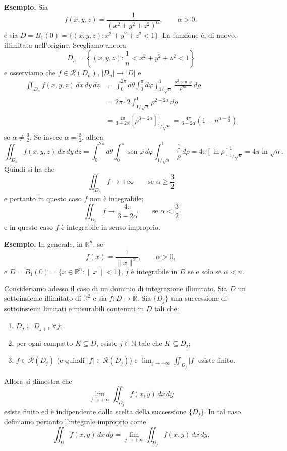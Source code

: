 \documentclass[11pt,a4paper]{article}
\newcommand{\R}{\mathbb{R}}
\newcommand{\N}{\mathbb{N}}
\newcommand{\sen}{\operatorname{sen}}
\begin{document}
\noindent\textbf{Esempio.} Sia
\[
f(x,y,z)=\frac{1}{(x^2+y^2+z^2)^\alpha},\qquad \alpha>0,
\]
e sia $D=B_1(0)=\{(x,y,z):x^2+y^2+z^2<1\}$. La funzione è, di nuovo, illimitata nell'origine. Scegliamo ancora
\[
D_n=\left\{(x,y,z):\frac1n<x^2+y^2+z^2<1\right\}
\]
e osserviamo che $f\in\mathcal{R}(D_n)$, $|D_n|\to|D|$ e
\begin{align*}
\iint_{D_n}f(x,y,z)\,dx\,dy\,dz
&=\int_0^{2\pi}d\theta\int_0^\pi d\varphi\int_{1/\sqrt n}^{1}
\frac{\rho^2\sen\varphi}{\rho^{2\alpha}}\,d\rho\\
&=2\pi\cdot2\int_{1/\sqrt n}^{1}\rho^{2-2\alpha}\,d\rho\\
&=\frac{4\pi}{3-2\alpha}\left[\rho^{3-2\alpha}\right]_{1/\sqrt n}^{1}
=\frac{4\pi}{3-2\alpha}\left(1-n^{\alpha-\frac32}\right)
\end{align*}
se $\alpha\neq\frac32$. Se invece $\alpha=\frac32$, allora
\[
\iint_{D_n}f(x,y,z)\,dx\,dy\,dz
=\int_0^{2\pi}d\theta\int_0^\pi\sen\varphi\,d\varphi\int_{1/\sqrt n}^{1}\frac1\rho\,d\rho
=4\pi[\ln\rho]_{1/\sqrt n}^{1}
=4\pi\ln\sqrt n.
\]
Quindi si ha che
\[
\iint_{D_n}f\to+\infty\qquad\text{se }\alpha\ge\frac32
\]
e pertanto in questo caso $f$ non è integrabile;
\[
\iint_{D_n}f\to\frac{4\pi}{3-2\alpha}\qquad\text{se }\alpha<\frac32
\]
e in questo caso $f$ è integrabile in senso improprio.

\noindent\textbf{Esempio.} In generale, in $\R^n$, se
\[
f(x)=\frac{1}{\lVert x\rVert^\alpha},\qquad \alpha>0,
\]
e $D=B_1(0)=\{x\in\R^n:\lVert x\rVert<1\}$, $f$ è integrabile in $D$ se e solo se $\alpha<n$.

Consideriamo adesso il caso di un dominio di integrazione illimitato. Sia $D$ un sottoinsieme illimitato di $\R^2$ e sia $f:D\to\R$. Sia $\{D_j\}$ una successione di sottoinsiemi limitati e misurabili contenuti in $D$ tali che:
\begin{enumerate}
\item $D_j\subseteq D_{j+1}\ \forall j$;
\item per ogni compatto $K\subseteq D$, esiste $j\in\N$ tale che $K\subseteq D_j$;
\item $f\in\mathcal{R}(D_j)$ (e quindi $|f|\in\mathcal{R}(D_j)$) e $\displaystyle\lim_{j\to+\infty}\iint_{D_j}|f|$ esiste finito.
\end{enumerate}
Allora si dimostra che
\[
\lim_{j\to+\infty}\iint_{D_j}f(x,y)\,dx\,dy
\]
esiste finito ed è indipendente dalla scelta della successione $\{D_j\}$. In tal caso definiamo pertanto l'integrale improprio come
\[
\iint_D f(x,y)\,dx\,dy
=\lim_{j\to+\infty}\iint_{D_j}f(x,y)\,dx\,dy.
\]
\end{document}
